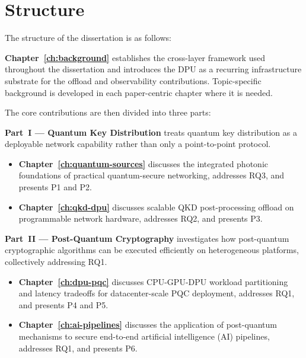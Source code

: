 \section{Structure}

The structure of the dissertation is as follows:

\medskip
\textbf{Chapter~\ref{ch:background}} establishes the cross-layer framework used throughout the dissertation and introduces the DPU as a recurring infrastructure substrate for the offload and observability contributions. Topic-specific background is developed in each paper-centric chapter where it is needed.

\medskip
The core contributions are then divided into three parts:

\medskip
\textbf{Part~I --- Quantum Key Distribution} treats quantum key distribution as a deployable network capability rather than only a point-to-point protocol.
\begin{itemize}
\item \textbf{Chapter~\ref{ch:quantum-sources}} discusses the integrated photonic foundations of practical quantum-secure networking, addresses RQ3, and presents P1 and P2.
\item \textbf{Chapter~\ref{ch:qkd-dpu}} discusses scalable QKD post-processing offload on programmable network hardware, addresses RQ2, and presents P3.
\end{itemize}

\medskip
\textbf{Part~II --- Post-Quantum Cryptography} investigates how post-quantum cryptographic algorithms can be executed efficiently on heterogeneous platforms, collectively addressing RQ1.
\begin{itemize}
\item \textbf{Chapter~\ref{ch:dpu-pqc}} discusses CPU-GPU-DPU workload partitioning and latency tradeoffs for datacenter-scale PQC deployment, addresses RQ1, and presents P4 and P5.
\item \textbf{Chapter~\ref{ch:ai-pipelines}} discusses the application of post-quantum mechanisms to secure end-to-end artificial intelligence (AI) pipelines, addresses RQ1, and presents P6.
\end{itemize}

